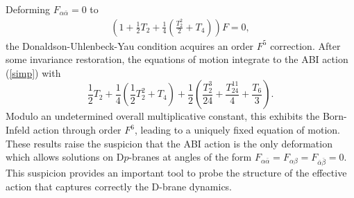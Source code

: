 \documentclass[a4paper,twocolumn]{article}
\begin{document}
Deforming $F_{\alpha\bar{\alpha}}=0$ to
\begin{eqnarray}
    \left(1+\frac{1}{2}T_2
    +\frac{1}{4}
    \left(
    \frac{T^2_2}{2}
        +T_4
    \right)\right)F=0,
\end{eqnarray}
the Donaldson-Uhlenbeck-Yau condition acquires  an order $F^5$
correction. After some invariance restoration, the equations of
motion integrate to the ABI action (\ref{simp}) with
\begin{equation}
        \frac{1}{2}T_2
    +\frac{1}{4}
    \left(
    \frac{1}{2}T^2_2
        +T_4
    \right)
    +\frac{1}{2}
    \left(
    \frac{T^3_2}{24}+\frac{T^{11}_{24}}{4}+\frac{T_6}{3}
    \right).
\end{equation}
Modulo an undetermined overall multiplicative constant, this
exhibits the Born-Infeld action through order $F^6$, leading to a
uniquely fixed equation of motion. These results raise the
suspicion that the ABI action is the only deformation which allows
solutions on D$p$-branes at angles of the form
$F_{\alpha\bar{\alpha}}=F_{\alpha\beta}=F_{\bar{\alpha}\bar{\beta}}=0$.
 \cite{koe} This suspicion provides an important tool to probe the
 structure of the effective action that captures correctly the
 D-brane dynamics.
\end{document}
